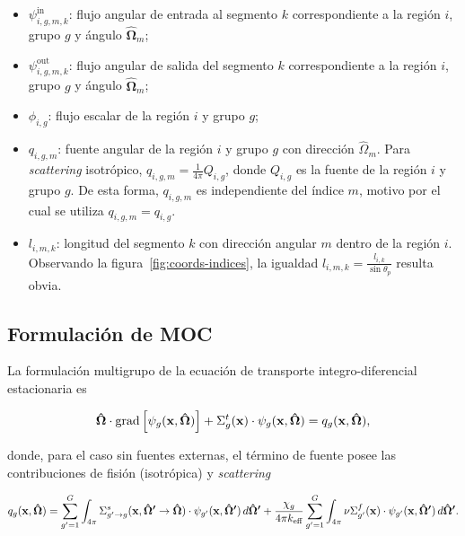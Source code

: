 \documentclass[11pt]{article}
\numberwithin{equation}{section}
\renewcommand{\vec}[1]{\ensuremath\mathbf{#1}}
\begin{document}
\begin{itemize}
\renewcommand\labelitemi{$\cdot$}
 \item $\psi^{\text{in}}_{i,g,m,k}$: flujo angular de entrada al segmento $k$ correspondiente a la región $i$, grupo $g$ y ángulo $\boldsymbol{\hat{\Omega}}_m$;
 \item $\psi^{\text{out}}_{i,g,m,k}$: flujo angular de salida del segmento $k$ correspondiente a la región $i$, grupo $g$ y ángulo $\boldsymbol{\hat{\Omega}}_m$;
 \item $\phi_{i,g}$: flujo escalar de la región $i$ y grupo $g$;
 \item $q_{i,g,m}$: fuente angular de la región $i$ y grupo $g$ con dirección $\hat{\Omega}_m$. Para \emph{scattering} isotrópico, $q_{i,g,m} = \frac{1}{4\pi}Q_{i,g}$, donde $Q_{i,g}$ es la fuente de la región $i$ y grupo $g$. De esta forma, $q_{i,g,m}$ es independiente del índice $m$, motivo por el cual se utiliza $q_{i,g,m} = q_{i,g}$.
 \item $l_{i,m,k}$: longitud del segmento $k$ con dirección angular $m$ dentro de la región $i$. Observando la figura~\ref{fig:coords-indices}, la igualdad $l_{i,m,k} = \frac{l_{i,k}}{\sin \theta_p}$ resulta obvia.
\end{itemize}

\subsection{Formulación de MOC}

La formulación multigrupo de la ecuación de transporte integro-diferencial estacionaria es~\cite{henry,lamarsh,duderstadt,glasstone,lewis,stammler,handbook-ingnuclear}

\begin{equation}
 \label{eq:transportemultigrupo}
 \boldsymbol{\hat{\Omega}} \cdot \text{grad} \left[ \psi_g(\vec{x}, \boldsymbol{\hat{\Omega}}) \right]
 + \Sigma^t_g(\vec{x}) \cdot \psi_g(\vec{x}, \boldsymbol{\hat{\Omega}}) = q_g(\vec{x}, \boldsymbol{\hat{\Omega}}),
\end{equation}

\noindent
donde, para el caso sin fuentes externas, el término de fuente posee las contribuciones de fisión (isotrópica) y \emph{scattering}

\begin{equation} \label{eq:fuentemultigrupo-1}
 q_g(\vec{x}, \boldsymbol{\hat{\Omega}}) =
 \sum_{g^\prime=1}^G \int_{4\pi} \Sigma^s_{g^\prime \rightarrow g}(\vec{x}, \boldsymbol{\hat{\Omega}^\prime} \rightarrow \boldsymbol{\hat{\Omega}}) \cdot \psi_{g^\prime}(\vec{x}, \boldsymbol{\hat{\Omega}^\prime}) \, d\boldsymbol{\hat{\Omega}^\prime} 
 + \frac{\chi_g}{4\pi k_{\text{eff}}} \sum_{g^\prime=1}^G \int_{4\pi} \nu\Sigma^f_{g^\prime}(\vec{x}) \cdot \psi_{g^\prime}(\vec{x}, \boldsymbol{\hat{\Omega}^\prime}) \, d\boldsymbol{\hat{\Omega}^\prime}.
\end{equation}
\end{document}
